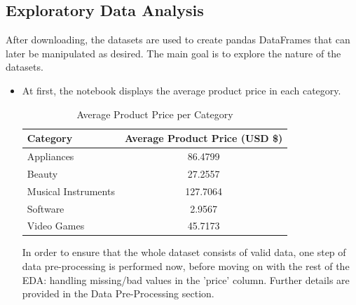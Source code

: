 \documentclass[a4paper, 12pt]{article}
\begin{document}
\subsection{Exploratory Data Analysis}
After downloading, the datasets are used to create pandas DataFrames that can later be manipulated as desired. The main goal is to explore the nature of the datasets.
\begin{itemize}
    \item At first, the notebook displays the average product price in each category.

    \begin{table}[H]
        \centering
        \caption{Average Product Price per Category}
        \begin{tabular}{lc}
        \hline
        \textbf{Category} & \textbf{Average Product Price (USD \$)} \\
        \hline
        Appliances & 86.4799 \\
        Beauty & 27.2557 \\
        Musical Instruments & 127.7064 \\
        Software & 2.9567 \\
        Video Games & 45.7173 \\
        \hline
        \end{tabular}
        \label{tab:avg_price}
    \end{table}
    In order to ensure that the whole dataset consists of valid data, one step of data pre-processing is performed now, before moving on with the rest of the EDA: handling missing/bad values in the 'price' column. Further details are provided in the Data Pre-Processing section.
    

\end{itemize}
\end{document}
